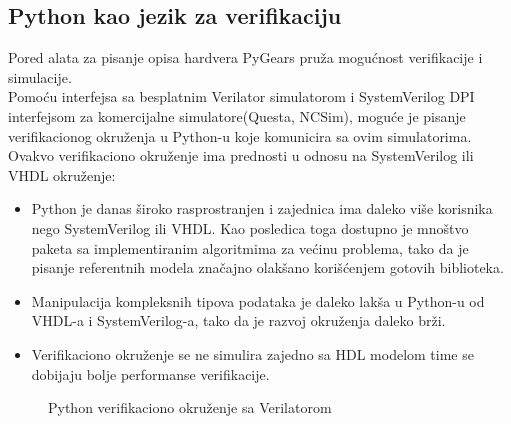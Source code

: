 \subsection{Python kao jezik za verifikaciju}

Pored alata za pisanje opisa hardvera PyGears pruža mogućnost verifikacije i
simulacije. \\
Pomoću interfejsa sa besplatnim Verilator simulatorom i SystemVerilog DPI\cite{SV_DPI} interfejsom za
komercijalne simulatore(Questa\cite{Questa}, NCSim\cite{NCSim}), moguće je
pisanje verifikacionog okruženja u Python-u koje komunicira sa ovim
simulatorima. \\

Ovakvo verifikaciono okruženje ima prednosti u odnosu na SystemVerilog ili
VHDL okruženje:
\begin{itemize}

\item Python je danas široko rasprostranjen i zajednica ima daleko više
  korisnika nego SystemVerilog ili VHDL. Kao posledica toga dostupno je mnoštvo
  paketa sa implementiranim algoritmima za većinu problema, tako da je pisanje
  referentnih modela značajno olakšano korišćenjem gotovih biblioteka.

\item Manipulacija kompleksnih tipova podataka je daleko lakša u Python-u od
  VHDL-a i SystemVerilog-a, tako da je razvoj okruženja daleko brži.

\item Verifikaciono okruženje se ne simulira zajedno sa HDL modelom time se
  dobijaju bolje performanse verifikacije.

\end{itemize}

\begin{figure}[H]
\centering{
  \scalebox{1.0}{
    
  }}
\caption{Python verifikaciono okruženje sa Verilatorom}
\label{python_verif1}
\end{figure}